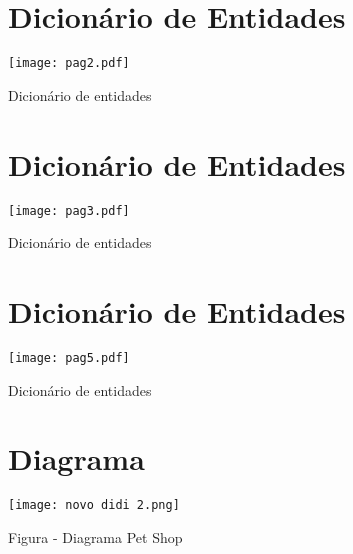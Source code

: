 \documentclass{article}
\begin{document}
\begin{figure}

\section{Dicionário de Entidades}

    \centering
    \texttt{[image: pag2.pdf]}
    \caption{Dicionário de entidades}
    \label{fig:placeholder}
\end{figure}

\begin{figure}

\section{Dicionário de Entidades}

    \centering
    \texttt{[image: pag3.pdf]}
    \caption{Dicionário de entidades}
    \label{fig:placeholder}
\end{figure}

\begin{figure}

\section{Dicionário de Entidades}

    \centering
    \texttt{[image: pag5.pdf]}
    \caption{Dicionário de entidades}
    \label{fig:placeholder}
\end{figure}


\begin{figure}
\section{Diagrama}
    \centering
    \texttt{[image: novo didi 2.png]}
    \caption{Figura - Diagrama Pet Shop}
    \label{fig:placeholder}
\end{figure}
\end{document}
